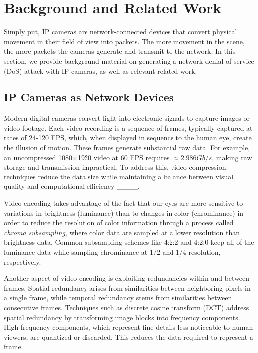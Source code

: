 \section{Background and Related Work}
\label{sec:background}

Simply put, IP cameras are network-connected devices that convert physical movement in their field of view into packets. 
The more movement in the scene, the more packets the cameras generate and transmit to the network. In this section, we provide background material on generating a network denial-of-service (DoS) attack with IP cameras, as well as relevant related work.

\subsection{IP Cameras as Network Devices}
\label{sec:compression}
Modern digital cameras convert light into electronic signals to capture images or video footage. Each video recording is a sequence of frames, typically captured at rates of 24-120 FPS, which, when displayed in sequence to the human eye, create the illusion of motion. These frames generate substantial raw data. For example, an uncompressed 1080×1920 video at 60 FPS requires $\approx 2.986Gb/s$, making raw storage and transmission impractical. To address this, video compression techniques reduce the data size while maintaining a balance between visual quality and computational efficiency ____.

Video encoding takes advantage of the fact that our eyes are more sensitive to variations in brightness (luminance) than to changes in color (chrominance) in order to reduce the resolution of color information through a process called \textit{chroma subsampling}, where color data are sampled at a lower resolution than brightness data. Common subsampling schemes like 4:2:2 and 4:2:0 keep all of the luminance data while sampling chrominance at $1/2$ and $1/4$ resolution, respectively.

Another aspect of video encoding is exploiting redundancies within and between frames. Spatial redundancy arises from similarities between neighboring pixels in a single frame, while temporal redundancy stems from similarities between consecutive frames. Techniques such as discrete cosine transform (DCT) address spatial redundancy by transforming image blocks into frequency components. High-frequency components, which represent fine details less noticeable to human viewers, are quantized or discarded. This reduces the data required to represent a frame.

